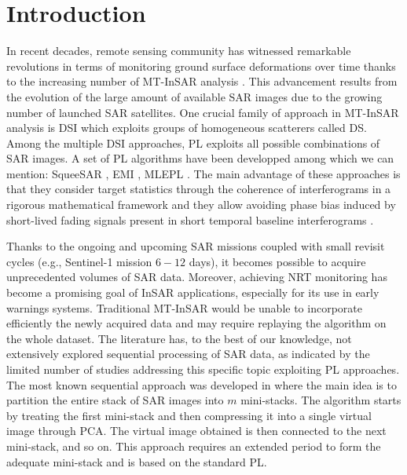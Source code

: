 \vspace{-5pt} 
\section{Introduction}
\label{sec:intro}
\vspace{-5pt} 

In recent decades, remote sensing community has witnessed remarkable revolutions in terms of monitoring ground surface deformations over time thanks to the increasing number of \ac{MT-InSAR} analysis \citep{osmanouglu2016time}. This advancement results from the evolution of the large amount of  available \acs{SAR} images due to the growing number of launched \acs{SAR} satellites. One crucial family of approach in \acs{MT-InSAR} analysis is \ac{DSI} which exploits groups of homogeneous scatterers called \ac{DS}. 
Among the multiple \acs{DSI} approaches, \ac{PL} exploits all possible combinations of \acs{SAR} images. A set of \acs{PL} algorithms
have been developped among which we can mention: SqueeSAR \citep{ferretti2011new}, \ac{EMI} \citep{ansari2018efficient}, \ac{MLEPL} \citep{vu2023robust, 9763551}. The main advantage of these approaches is that they consider target statistics through the coherence of interferograms in a rigorous mathematical framework and they allow avoiding phase bias induced by short-lived fading signals present in short temporal baseline interferograms \citep{ansari2020study}.

Thanks to the ongoing and upcoming \acs{SAR} missions coupled with small revisit cycles (e.g., Sentinel-1 mission $6-12$ days), it becomes possible to acquire unprecedented volumes of \acs{SAR} data. Moreover, achieving \ac{NRT} monitoring has become a promising goal of \acs{InSAR} applications, especially for its use in early warnings systems. Traditional \acs{MT-InSAR} would be unable to incorporate efficiently the newly acquired data and may require replaying the algorithm on the whole dataset. The literature has, to the best of our knowledge, not extensively explored sequential processing of \acs{SAR} data, as indicated by the limited number of studies addressing this specific topic exploiting \acs{PL} approaches. The most known sequential approach was developed in \citep{ansari2017sequential} where the main idea is to partition the entire stack of \acs{SAR} images into $m$ mini-stacks. The algorithm starts by treating the first mini-stack and then compressing it into a single virtual image through \ac{PCA}. The virtual image obtained is then connected to the next mini-stack, and so on. This approach requires an extended period to form the adequate mini-stack and is based on the standard \acs{PL}. 

